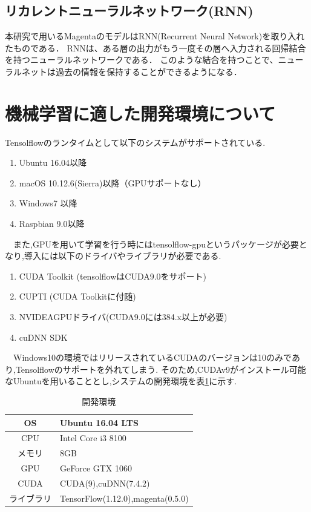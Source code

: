 \subsection{リカレントニューラルネットワーク(RNN)}
本研究で用いるMagentaのモデルはRNN(Recurrent Neural Network)を取り入れたものである．
RNNは、ある層の出力がもう一度その層へ入力される回帰結合を持つニューラルネットワークである．
このような結合を持つことで、ニューラルネットは過去の情報を保持することができるようになる．
\newpage
\section{機械学習に適した開発環境について}
Tensolflowのランタイムとして以下のシステムがサポートされている.\cite{webpage8}
\begin{enumerate}
    \renewcommand{\labelenumi}{(\arabic{enumi})}
    \item Ubuntu 16.04以降
    \item macOS 10.12.6(Sierra)以降（GPUサポートなし）
    \item Windows7 以降
    \item Raspbian 9.0以降
\end{enumerate}
　また,GPUを用いて学習を行う時にはtensolflow-gpuというパッケージが必要となり,導入には以下のドライバやライブラリが必要である.\cite{webpage7}
\begin{enumerate}
    \renewcommand{\labelenumi}{(\arabic{enumi})}
    \item CUDA Toolkit (tensolflowはCUDA9.0をサポート)
    \item CUPTI (CUDA Toolkitに付随)
    \item NVIDEAGPUドライバ(CUDA9.0には384.x以上が必要)
    \item cuDNN SDK
\end{enumerate}
　Windows10の環境ではリリースされているCUDAのバージョンは10のみであり,Tensolflowのサポートを外れてしまう.
そのため,CUDAv9がインストール可能なUbuntuを用いることとし,システムの開発環境を表\ref{tab:開発環境}に示す.
\begin{table}[h]
\begin{center}
\caption{開発環境}
\label{tab:開発環境}
\begin{tabular}{|c|p{}|}
\hline
    OS & Ubuntu 16.04 LTS\\
    \hline
    CPU & Intel Core i3 8100\\
    \hline
    メモリ & 8GB\\
    \hline
    GPU & GeForce GTX 1060\\
    \hline
    CUDA & CUDA(9),cuDNN(7.4.2)\\
    \hline
    ライブラリ & TensorFlow(1.12.0),magenta(0.5.0)\\
    \hline
\end{tabular}
\end{center}
\end{table}\\
\newpage
